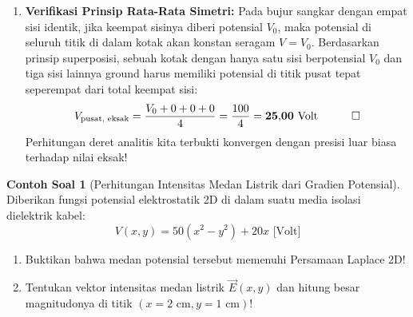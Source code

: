 \documentclass[11pt,a4paper]{article}
\theoremstyle{definition}
\newtheorem{example}{Contoh Soal}[section]
\begin{document}
\begin{enumerate}[leftmargin=*]
    \item \textbf{Verifikasi Prinsip Rata-Rata Simetri:}
    Pada bujur sangkar dengan empat sisi identik, jika keempat sisinya diberi potensial $V_0$, maka potensial di seluruh titik di dalam kotak akan konstan seragam $V = V_0$. Berdasarkan prinsip superposisi, sebuah kotak dengan hanya satu sisi berpotensial $V_0$ dan tiga sisi lainnya ground harus memiliki potensial di titik pusat tepat seperempat dari total keempat sisi:
    \begin{equation*}
        V_{\text{pusat, eksak}} = \frac{V_0 + 0 + 0 + 0}{4} = \frac{100}{4} = \mathbf{25{,}00\text{ Volt}} \quad \qed
    \end{equation*}
    Perhitungan deret analitis kita terbukti konvergen dengan presisi luar biasa terhadap nilai eksak!
\end{enumerate}

\begin{example}[Perhitungan Intensitas Medan Listrik dari Gradien Potensial]
Diberikan fungsi potensial elektrostatik 2D di dalam suatu media isolasi dielektrik kabel:
\begin{equation*}
    V(x, y) = 50 (x^2 - y^2) + 20x\text{ [Volt]}
\end{equation*}
\begin{enumerate}[leftmargin=*]
    \item Buktikan bahwa medan potensial tersebut memenuhi Persamaan Laplace 2D!
    \item Tentukan vektor intensitas medan listrik $\vec{E}(x, y)$ dan hitung besar magnitudonya di titik $(x = 2\text{ cm}, y = 1\text{ cm})$!
\end{enumerate}
\end{example}
\end{document}
